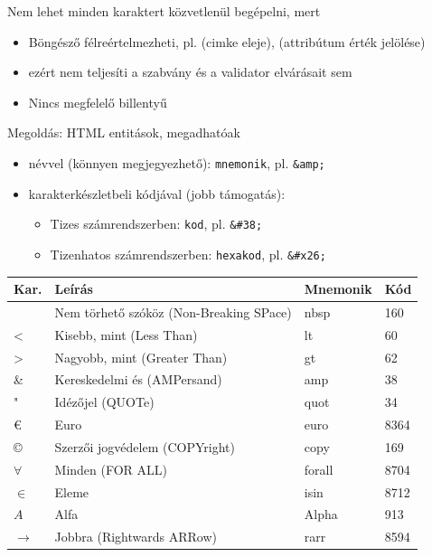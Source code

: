 \begin{frame}
  Nem lehet minden karaktert közvetlenül begépelni, mert
  \begin{itemize}
    \item Böngésző félreértelmezheti, pl. \kiemel{\texttt{<}} (cimke eleje),  (attribútum érték jelölése)
    \item ezért nem teljesíti a szabvány és a validator elvárásait sem
    \item Nincs megfelelő billentyű
  \end{itemize}
  Megoldás: HTML entitások, megadhatóak
  \begin{itemize}
    \item névvel (könnyen megjegyezhető): \texttt{\kiemel{\&}mnemonik\kiemel{;}}, pl. \texttt{\&amp;}
    \item karakterkészletbeli kódjával (jobb támogatás): 
    \begin{itemize}
      \item Tizes számrendszerben: \texttt{\kiemel{\&\#}kod\kiemel{;}}, pl. \texttt{\&\#38;}
      \item Tizenhatos számrendszerben: \texttt{hexakod\kiemel{;}}, pl. \texttt{\&\#x26;}
    \end{itemize}
  \end{itemize}
\end{frame}

\begin{frame}
  \begin{table}
    \begin{tabular}{llll}
    Kar.           & Leírás                                  & Mnemonik & Kód  \\ \hline
                   & Nem törhető szóköz (Non-Breaking SPace) & nbsp     & 160  \\
    \textless{}    & Kisebb, mint (Less Than)                & lt       & 60   \\
    \textgreater{} & Nagyobb, mint (Greater Than)            & gt       & 62   \\
    \&             & Kereskedelmi és (AMPersand)             & amp      & 38   \\
    "              & Idézőjel (QUOTe)                        & quot     & 34   \\
    \euro          & Euro                                    & euro     & 8364 \\
    \copyright     & Szerzői jogvédelem (COPYright)          & copy     & 169  \\
    $\forall$      & Minden (FOR ALL)                        & forall   & 8704 \\
    $\in$          & Eleme                                   & isin     & 8712 \\
    $A$            & Alfa                                    & Alpha    & 913  \\
    $\to$          & Jobbra (Rightwards ARRow)               & rarr     & 8594
    \end{tabular}
\end{table}
\end{frame}

